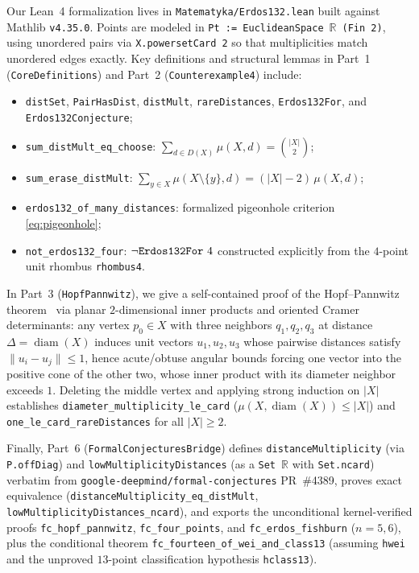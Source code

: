 \documentclass[11pt,reqno]{amsart}
\theoremstyle{definition}
\newcommand{\R}{\mathbb{R}}
\newcommand{\card}[1]{|#1|}
\begin{document}
Our Lean~4 formalization lives in \texttt{Matematyka/\allowbreak Erdos132.lean} built against Mathlib \texttt{v4.35.0}. Points are modeled in \texttt{Pt := EuclideanSpace}~$\R$~\texttt{(Fin 2)}, using unordered pairs via \texttt{X.powersetCard 2} so that multiplicities match unordered edges exactly. Key definitions and structural lemmas in Part~1 (\texttt{CoreDefinitions}) and Part~2 (\texttt{Counterexample4}) include:
\begin{itemize}
  \item \texttt{distSet}, \texttt{PairHasDist}, \texttt{distMult}, \texttt{rareDistances}, \texttt{Erdos132For}, and \texttt{Erdos132Conjecture};
  \item \texttt{sum\_distMult\_eq\_choose}: $\sum_{d \in D(X)} \mu(X, d) = \binom{\card{X}}{2}$;
  \item \texttt{sum\_erase\_distMult}: $\sum_{y \in X} \mu(X \setminus \{y\}, d) = (\card{X} - 2)\,\mu(X, d)$;
  \item \texttt{erdos132\_of\_many\_distances}: formalized pigeonhole criterion \eqref{eq:pigeonhole};
  \item \texttt{not\_erdos132\_four}: $\neg\text{\texttt{Erdos132For}}\ 4$ constructed explicitly from the $4$-point unit rhombus \texttt{rhombus4}.
\end{itemize}

In Part~3 (\texttt{HopfPannwitz}), we give a self-contained proof of the Hopf--Pannwitz theorem~\cite{HoPa34} via planar $2$-dimensional inner products and oriented Cramer determinants: any vertex $p_0 \in X$ with three neighbors $q_1, q_2, q_3$ at distance $\Delta = \operatorname{diam}(X)$ induces unit vectors $u_1, u_2, u_3$ whose pairwise distances satisfy $\|u_i - u_j\| \le 1$, hence acute/obtuse angular bounds forcing one vector into the positive cone of the other two, whose inner product with its diameter neighbor exceeds $1$. Deleting the middle vertex and applying strong induction on $\card{X}$ establishes \texttt{diameter\_multiplicity\_le\_card} ($\mu(X, \operatorname{diam}(X)) \le \card{X}$) and \texttt{one\_le\_card\_rareDistances} for all $\card{X} \ge 2$.

Finally, Part~6 (\texttt{FormalConjecturesBridge}) defines \texttt{distance\allowbreak Multiplicity} (via \texttt{P.offDiag}) and \texttt{low\allowbreak Multiplicity\allowbreak Distances} (as a \texttt{Set}~$\R$ with \texttt{Set.ncard}) verbatim from \texttt{google-deepmind/\allowbreak formal-conjectures} PR~\#4389, proves exact equivalence (\texttt{distance\allowbreak Multiplicity\_\allowbreak eq\_\allowbreak distMult}, \texttt{low\allowbreak Multiplicity\allowbreak Distances\_\allowbreak ncard}), and exports the unconditional kernel-verified proofs \texttt{fc\_hopf\_pannwitz}, \texttt{fc\_four\_points}, and \texttt{fc\_erdos\_fishburn} ($n = 5, 6$), plus the conditional theorem \texttt{fc\_\allowbreak fourteen\_\allowbreak of\_\allowbreak wei\_\allowbreak and\_\allowbreak class13} (assuming \texttt{hwei} and the unproved $13$-point classification hypothesis \texttt{hclass13}).
\end{document}
